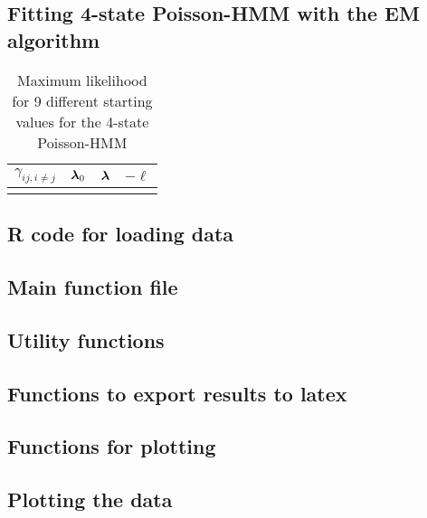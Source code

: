 \subsection{Fitting 4-state Poisson-HMM with the EM algorithm}
\label{app:4-state-em-results}

\begin{table}[ht]
    \centering
    \begin{tabular}{cccc}
        $\gamma_{ij, i\neq j}$ & $\boldsymbol{\lambda}_0$ & $\boldsymbol{\lambda}$ & $-\ell$ \\\hline
        }
    \end{tabular}
    \caption{Maximum likelihood for 9 different starting values for the 4-state Poisson-HMM}
    \label{tbl:4-state-fits-em}
\end{table}

\FloatBarrier
\pagebreak

\subsection{R code for loading data}

\pagebreak

\subsection{Main function file}
\label{app:functions.R}

\pagebreak

\subsection{Utility functions}

\pagebreak

\subsection{Functions to export results to latex}

\pagebreak

\subsection{Functions for plotting}

\pagebreak

\subsection{Plotting the data}

\pagebreak

